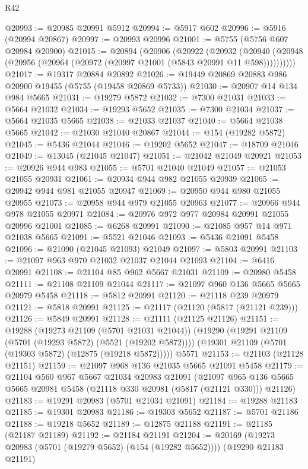 \begin{lexlean}{R42}
\begin{coremodule}
@20993 := @20985 @20991 @5912
@20994 := @5917 @602
@20996 := @5916 (@20994 @20867)
@20997 := @20993 @20996
@21001 := @5755 (@5756 @607 @20984 @20900)
@21015 := @20894
    (@20906
      (@20922
        (@20932
          (@20940 (@20948 (@20956 (@20964 (@20972 (@20997 @21001 (@5843 @20991 @11 @598))))))))))
@21017 := @19317 @20884 @20892
@21026 := @19449 @20869 @20883 @986 @20900 @19455 (@5755 (@19458 @20869 @5733))
@21030 := @20907 @14 @134 @984 @5665
@21031 := @19279 @5872
@21032 := @7300 @21031
@21033 := @5664 @21032
@21034 := @19293 @5652
@21035 := @7300 @21034
@21037 := @5664 @21035 @5665
@21038 := @21033 @21037
@21040 := @5664 @21038 @5665
@21042 := @21030 @21040 @20867
@21044 := @154 (@19282 @5872)
@21045 := @5436 @21044
@21046 := @19202 @5652
@21047 := @18709 @21046
@21049 := @13045 (@21045 @21047)
@21051 := @21042 @21049 @20921
@21053 := @20926 @944 @983
@21055 := @5701 @21040 @21049
@21057 := @21053 @21055 @20931
@21061 := @20934 @944 @982 @21055 @20939
@21065 := @20942 @944 @981 @21055 @20947
@21069 := @20950 @944 @980 @21055 @20955
@21073 := @20958 @944 @979 @21055 @20963
@21077 := @20966 @944 @978 @21055 @20971
@21084 := @20976 @972 @977 @20984 @20991 @21055 @20996 @21001
@21085 := @6268 @20991
@21090 := @21085 @957 @14 @971 @21038 @5665
@21091 := @5521 @21046
@21093 := @5436 @21091 @5458
@21096 := @21090 (@21045 @21093) @21049
@21097 := @5803 @20991
@21103 := @21097 @963 @970 @21032 @21037 @21044 @21093
@21104 := @6416 @20991
@21108 := @21104 @85 @962 @5667 @21031
@21109 := @20980 @5458
@21111 := @21108 @21109 @21044
@21117 := @21097 @960 @136 @5665 @5665 @20979 @5458
@21118 := @5812 @20991
@21120 := @21118 @239 @20979
@21121 := @5818 @20991
@21125 := @21117 (@21120 (@5817 (@21121 @239)))
@21126 := @5849 @20991
@21128 := @21111 (@21125 @21126)
@21151 := @19288
    (@19273 @21109 (@5701 @21031 @21044))
    (@19290
      (@19291 @21109 (@5701 (@19293 @5872) (@5521 (@19202 @5872))))
      (@19301 @21109 (@5701 (@19303 @5872) (@12875 (@19218 @5872)))))
    @5571
@21153 := @21103 (@21128 @21151)
@21159 := @21097 @968 @136 @21035 @5665 @21091 @5458
@21179 := @21104
    @560
    @967
    @5667
    @21034
    @20983
    @21091
    (@21097 @965 @136 @5665 @5665 @20981 @5458 (@21118 @330 @20981 (@5817 (@21121 @330))) @21126)
@21183 := @19291 @20983 (@5701 @21034 @21091)
@21184 := @19288 @21183
@21185 := @19301 @20983
@21186 := @19303 @5652
@21187 := @5701 @21186
@21188 := @19218 @5652
@21189 := @12875 @21188
@21191 := @21185 (@21187 @21189)
@21192 := @21184 @21191
@21204 := @20169
    (@19273 @20983 (@5701 (@19279 @5652) (@154 (@19282 @5652))))
    (@19290 @21183 @21191)

\end{coremodule}
\end{lexlean}
